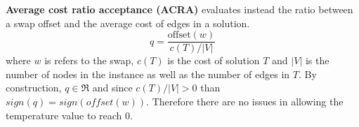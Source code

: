 \textbf{Average cost ratio acceptance (ACRA)} evaluates instead the ratio between a swap offset and the average cost of edges in a solution.
\[
    q = \frac{\text{offset}(w)}{c(T)/|V|}
\]
where $w$ is refers to the swap, $c(T)$ is the cost of solution $T$ and $|V|$ is the number of nodes in the instance as well as the number of edges in $T$.
By construction, $q \in \Re$ and since $c(T)/|V| > 0$ than $sign(q) = sign(offset(w))$.
Therefore there are no issues in allowing the temperature value to reach 0.



